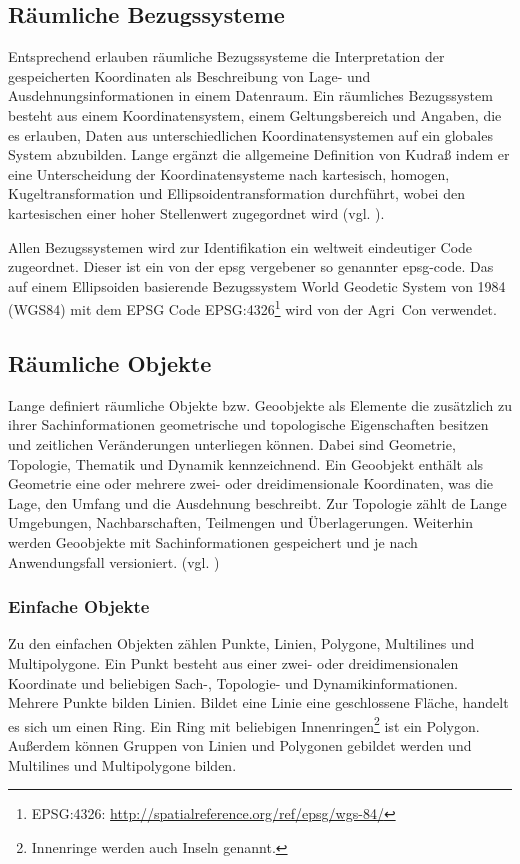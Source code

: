\subsection{Räumliche Bezugssysteme}
Entsprechend \cite[S.506]{book:kudrass} erlauben räumliche Bezugssysteme die Interpretation der gespeicherten Koordinaten als Beschreibung von Lage- und Ausdehnungsinformationen in einem Datenraum. Ein räumliches Bezugssystem besteht aus einem Koordinatensystem, einem Geltungsbereich und Angaben, die es erlauben, Daten aus unterschiedlichen Koordinatensystemen auf ein globales System abzubilden.
Lange ergänzt die allgemeine Definition von Kudraß indem er eine Unterscheidung der Koordinatensysteme nach kartesisch, homogen, Kugeltransformation und Ellipsoidentransformation durchführt, wobei den kartesischen einer hoher Stellenwert zugegordnet wird (vgl. \cite[S.141 ff.]{book:gi-theopluspraxis3}).

Allen Bezugssystemen wird zur Identifikation ein weltweit eindeutiger Code zugeordnet.
Dieser ist ein von der \Gls{epsg} vergebener so genannter \Gls{epsg-code}.
Das auf einem Ellipsoiden basierende Bezugssystem World Geodetic System von 1984 (WGS84) mit dem EPSG Code EPSG:4326\footnote{EPSG:4326: \url{http://spatialreference.org/ref/epsg/wgs-84/}} wird von der Agri~Con verwendet.


\subsection{Räumliche Objekte}
Lange definiert räumliche Objekte bzw. Geoobjekte als Elemente die zusätzlich zu ihrer Sachinformationen geometrische und topologische Eigenschaften besitzen und zeitlichen Veränderungen unterliegen können. Dabei sind Geometrie, Topologie, Thematik und Dynamik kennzeichnend.
Ein Geoobjekt enthält als Geometrie eine oder mehrere zwei- oder dreidimensionale Koordinaten, was die Lage, den Umfang und die Ausdehnung beschreibt.
Zur Topologie zählt de Lange Umgebungen, Nachbarschaften, Teilmengen und Überlagerungen.
Weiterhin werden Geoobjekte mit Sachinformationen gespeichert und je nach Anwendungsfall versioniert. (vgl. \cite[S.133]{book:gi-theopluspraxis3})


\subsubsection{Einfache Objekte}
Zu den einfachen Objekten zählen Punkte, Linien, Polygone, Multilines und Multipolygone.
Ein Punkt besteht aus einer zwei- oder dreidimensionalen Koordinate und beliebigen Sach-, Topologie- und Dynamikinformationen.
Mehrere Punkte bilden Linien.
Bildet eine Linie eine geschlossene Fläche, handelt es sich um einen Ring.
Ein Ring mit beliebigen Innenringen\footnote{Innenringe werden auch Inseln genannt.} ist ein Polygon.
Außerdem können Gruppen von Linien und Polygonen gebildet werden und Multilines und Multipolygone bilden.

